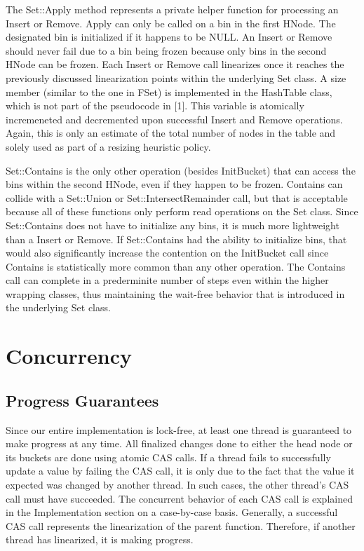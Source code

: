 \documentclass[11pt]{article} %
\begin{document}
The Set::Apply method represents a private helper function for processing an Insert or Remove. Apply can only be called on a bin in the first HNode. The designated bin is initialized if it happens to be NULL. An Insert or Remove should never fail due to a bin being frozen because only bins in the second HNode can be frozen. Each Insert or Remove call linearizes once it reaches the previously discussed linearization points within the underlying Set class. A size member (similar to the one in FSet) is implemented in the HashTable class, which is not part of the pseudocode in [1]. This variable is atomically incremeneted and decremented upon successful Insert and Remove operations. Again, this is only an estimate of the total number of nodes in the table and solely used as part of a resizing heuristic policy.

Set::Contains is the only other operation (besides InitBucket) that can access the bins within the second HNode, even if they happen to be frozen. Contains can collide with a Set::Union or Set::IntersectRemainder call, but that is acceptable because all of these functions only perform read operations on the Set class. Since Set::Contains does not have to initialize any bins, it is much more lightweight than a Insert or Remove. If Set::Contains had the ability to initialize bins, that would also significantly increase the contention on the InitBucket call since Contains is statistically more common than any other operation. The Contains call can complete in a prederminite number of steps even within the higher wrapping classes, thus maintaining the wait-free behavior that is introduced in the underlying Set class.

\section{Concurrency}

\subsection{Progress Guarantees}

Since our entire implementation is lock-free, at least one thread is guaranteed to make progress at any time. All finalized changes done to either the head node or its buckets are done using atomic CAS calls. If a thread fails to successfully update a value by failing the CAS call, it is only due to the fact that the value it expected was changed by another thread. In such cases, the other thread's CAS call must have succeeded. The concurrent behavior of each CAS call is explained in the Implementation section on a case-by-case basis. Generally, a successful CAS call represents the linearization of the parent function. Therefore, if another thread has linearized, it is making progress.
\end{document}

